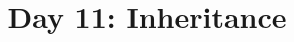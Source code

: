 \documentclass{article}
\begin{document}
\title{Day 11: Inheritance}
\author{}
\date{}
\maketitle




\end{document}
